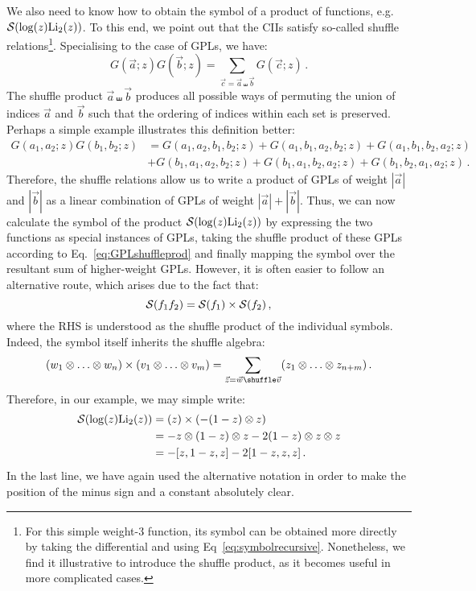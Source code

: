 \documentclass[main.tex]{subfiles}
\begin{document}
We also need to know how to obtain the symbol of a product of functions, e.g. $\mathcal{S}(\log(z) \text{Li}_2(z))$. To this end, we point out that the CIIs satisfy so-called shuffle relations\footnote{For this simple weight-3 function, its symbol can be obtained more directly by taking the differential and using Eq~\ref{eq:symbolrecursive}. Nonetheless, we find it illustrative to introduce the shuffle product, as it becomes useful in more complicated cases.}. Specialising to the case of GPLs, we have:
\begin{equation} \label{eq:GPLshuffleprod}
    G(\vec{a};z)G(\vec{b};z) = \sum_{\vec{c}=\vec{a} \shuffle \vec{b}} G(\vec{c};z)\,.
\end{equation}
The shuffle product $\vec{a} \shuffle \vec{b}$ produces all possible ways of permuting the union of indices $\vec{a}$ and $\vec{b}$ such that the ordering of indices within each set is preserved. Perhaps a simple example illustrates this definition better:
\begin{align} \label{eq:shuffleexample}
    G(a_1,a_2;z) G(b_1,b_2;z) &= G(a_1,a_2,b_1,b_2;z) + G(a_1,b_1,a_2,b_2;z) + G(a_1,b_1,b_2,a_2;z) \nonumber \\ 
    & + G(b_1,a_1,a_2,b_2;z) + G(b_1,a_1,b_2,a_2;z) + G(b_1,b_2,a_1,a_2;z)\,.
\end{align}
Therefore, the shuffle relations allow us to write a product of GPLs of weight $|\vec{a}|$ and $|\vec{b}|$ as a linear combination of GPLs of weight $|\vec{a}|+|\vec{b}|$. Thus, we can now calculate the symbol of the product $\mathcal{S}(\log(z) \text{Li}_2(z))$ by expressing the two functions as special instances of GPLs, taking the shuffle product of these GPLs according to Eq.~\ref{eq:GPLshuffleprod} and finally mapping the symbol over the resultant sum of higher-weight GPLs. However, it is often easier to follow an alternative route, which arises due to the fact that:
\begin{equation}
    \mathcal{S}(f_1 f_2) = \mathcal{S}(f_1) \times \mathcal{S}(f_2)\,,
\end{equation}
where the RHS is understood as the shuffle product of the individual symbols. Indeed, the symbol itself inherits the shuffle algebra:
\begin{equation} \label{eq:symbolshuffle}
    (w_1 \oo \ldots \oo w_n) \times (v_1 \oo \ldots \oo v_m) = \sum_{\vec{z}=\vec{w} \shuffle \vec{v}} (z_1 \oo \ldots \oo z_{n+m})\,.
\end{equation}
Therefore, in our example, we may simple write: 
\begin{align}
    \mathcal{S}(\log(z) \text{Li}_2(z)) &= (z) \times (-(1-z)\otimes z) \nonumber \\
    &= -z \otimes (1-z) \otimes z - 2 (1-z) \otimes z \otimes z \\
    &= -[z, 1-z, z] -2[1-z, z, z] \,. \nonumber
\end{align}
In the last line, we have again used the alternative notation in order to make the position of the minus sign and a constant absolutely clear.
\end{document}
